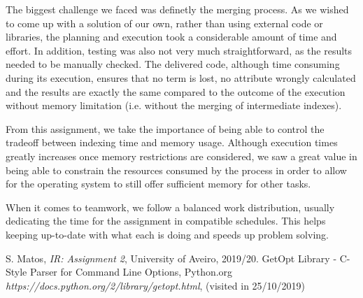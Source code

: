 \documentclass[12pt]{article}
\begin{document}
The biggest challenge we faced was definetly the merging process.
As we wished to come up with a solution of our own, rather than using external code or 
libraries, the planning and execution took a considerable amount of time and effort.
In addition, testing was also not very much straightforward, as the results needed to
be manually checked.
The delivered code, although time consuming during its execution, ensures that no term
is lost, no attribute wrongly calculated and the results are exactly the same compared
to the outcome of the execution without memory limitation (i.e. without the merging of
intermediate indexes).

From this assignment, we take the importance of being able to control the tradeoff 
between indexing time and memory usage.
Although execution times greatly increases once memory restrictions are considered, we
saw a great value in being able to constrain the resources consumed by the process 
in order to allow for the operating system to still offer sufficient memory for other
tasks.

When it comes to teamwork, we follow a balanced work distribution, usually dedicating
the time for the assignment in compatible schedules. This helps keeping up-to-date with 
what each is doing and speeds up problem solving. 

\begin{thebibliography}{9}
  

    S. Matos,
    \textit{IR: Assignment 2},
    University of Aveiro,
    2019/20.
    GetOpt Library - C-Style Parser for Command Line Options,
    Python.org
    \textit{https://docs.python.org/2/library/getopt.html},
    (visited in 25/10/2019)
  
\end{thebibliography}

\clearpage
\end{document}
